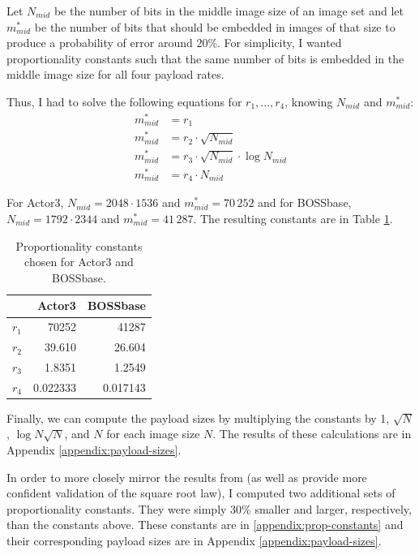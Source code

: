 \documentclass[11pt,a4paper,twoside,openright]{report}
\begin{document}
Let $N_{mid}$ be the number of bits in the middle image size of an image set and let $m_{mid}^{\ast}$ be the number of bits that should be embedded in images of that size to produce a probability of error around 20\%. For simplicity, I wanted proportionality constants such that the same number of bits is embedded in the middle image size for all four payload rates.

Thus, I had to solve the following equations for $r_1,...,r_4$, knowing $N_{mid}$ and $m_{mid}^{\ast}$:
    \begin{align*}
    m^{\ast}_{mid} &= r_1 \\
    m^{\ast}_{mid} &= r_2 \cdot \sqrt{N_{mid}} \\
    m^{\ast}_{mid} &= r_3 \cdot \sqrt{N_{mid}} \cdot \log N_{mid} \\
    m^{\ast}_{mid} &= r_4 \cdot N_{mid}
    \end{align*}

For Actor3, $N_{mid} = 2048\cdot1536$ and $m_{mid}^{\ast}=70\,252$ and for BOSSbase, $N_{mid} = 1792 \cdot 2344$ and $m_{mid}^{\ast}=41\,287$. The resulting constants are in Table \ref{fig:prop-constants}.

\begin{table}[htbp]
    \begin{center}
        \begin{tabular}{ r | r  r}
        & Actor3 & BOSSbase \\ \hline
        $r_1$ & 70252 & 41287 \\
        $r_2$ & 39.610 & 26.604 \\
        $r_3$ & 1.8351 & 1.2549 \\
        $r_4$ & 0.022333 & 0.017143 \\
        \end{tabular}
        \caption{Proportionality constants chosen for Actor3 and BOSSbase.}
        \label{fig:prop-constants}
    \end{center}
\end{table}

Finally, we can compute the payload sizes by multiplying the constants by 1, $\sqrt{N}$, $\log{N} \sqrt{N}$, and $N$ for each image size $N$. The results of these calculations are in Appendix \ref{appendix:payload-sizes}.

In order to more closely mirror the results from \cite{2008-paper} (as well as provide more confident validation of the square root law), I computed two additional sets of proportionality constants. They were simply 30\% smaller and larger, respectively, than the constants above. These constants are in \ref{appendix:prop-constants} and their corresponding payload sizes are in Appendix \ref{appendix:payload-sizes}.
\end{document}
